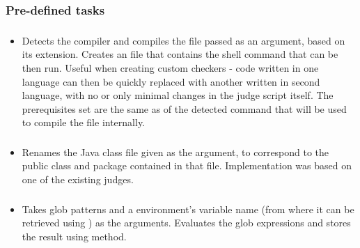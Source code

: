\subsubsection{Pre-defined tasks}\label{subsec:predefined_tasks}

\subsubsection*{}\label{subsec:AutoCompile}

\begin{itemize}[label={}]
    \item Detects the compiler and compiles the file passed as an argument, based on its extension.
          Creates an  file that contains the shell command that can be then run.
          Useful when creating custom checkers - code written in one language can then be quickly replaced with another
          written in second language, with no or only minimal changes in the judge script itself.
          The prerequisites set are the same as of the detected command that will be used to compile the file
          internally.
\end{itemize}

\subsubsection*{}\label{subsec:RenameJavaFile}

\begin{itemize}[label={}]
    \item Renames the Java class file given as the argument, to correspond to the public class and package contained in
          that file.
          Implementation was based on one of the existing judges.
\end{itemize}

\subsubsection*{}\label{subsec:ListFiles}

\begin{itemize}[label={}]
    \item Takes glob patterns and a environment's variable name (from where it can be retrieved using
          \hyperref[sec:DependentExpr]{}) as the arguments.
          Evaluates the glob expressions and stores the result using
          \hyperref[sec:set_variable]{} method.
\end{itemize}

